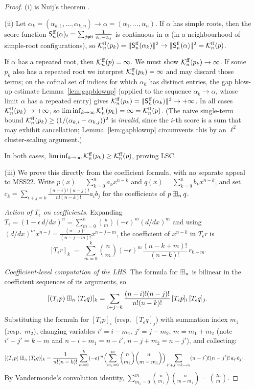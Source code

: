 \begin{proof}
(i) is Nuij's theorem \cite{Nuij}.

(ii) Let $\alpha_k=(\alpha_{k,1},\dots,\alpha_{k,n})\to\alpha=(\alpha_1,\dots,\alpha_n)$.
If $\alpha$ has simple roots, then the score function
$\mathsf{S}^{\mathrm{ff}}_n(\alpha)_i=\sum_{j\ne i}\frac{1}{\alpha_i-\alpha_j}$ is continuous in
$\alpha$ (in a neighbourhood of simple-root configurations), so
$\mathcal{K}^{\mathrm{ff}}_n(p_k)=\|\mathsf{S}^{\mathrm{ff}}_n(\alpha_k)\|^2\to\|\mathsf{S}^{\mathrm{ff}}_n(\alpha)\|^2=\mathcal{K}^{\mathrm{ff}}_n(p)$.

If $\alpha$ has a repeated root, then $\mathcal{K}^{\mathrm{ff}}_n(p)=\infty$. We must show
$\mathcal{K}^{\mathrm{ff}}_n(p_k)\to\infty$. If some $p_k$ also has a repeated root we interpret
$\mathcal{K}^{\mathrm{ff}}_n(p_k)=\infty$ and may discard those terms; on the cofinal set of indices
for which $\alpha_k$ has distinct entries, the gap blow-up estimate
Lemma~\ref{lem:gapblowup} (applied to the sequence $\alpha_k\to\alpha$, whose limit
$\alpha$ has a repeated entry) gives $\mathcal{K}^{\mathrm{ff}}_n(p_k)=\|\mathsf{S}^{\mathrm{ff}}_n(\alpha_k)\|^2\to+\infty$.
In all cases $\mathcal{K}^{\mathrm{ff}}_n(p_k)\to+\infty$, so
$\liminf_{k\to\infty}\mathcal{K}^{\mathrm{ff}}_n(p_k)=\infty=\mathcal{K}^{\mathrm{ff}}_n(p)$.
(The naive single-term bound $\mathcal{K}^{\mathrm{ff}}_n(p_k)\ge(1/(\alpha_{k,i}-\alpha_{k,j}))^2$ is
\emph{invalid}, since the $i$-th score is a sum that may exhibit cancellation;
Lemma~\ref{lem:gapblowup} circumvents this by an $\ell^2$ cluster-scaling argument.)

In both cases, $\liminf_{k\to\infty}\mathcal{K}^{\mathrm{ff}}_n(p_k)\ge\mathcal{K}^{\mathrm{ff}}_n(p)$, proving LSC.

(iii) We prove this directly from the coefficient formula, with no separate
appeal to MSS22.  Write $p(x)=\sum_{k=0}^n a_k x^{n-k}$ and
$q(x)=\sum_{k=0}^n b_k x^{n-k}$, and set
$c_k = \sum_{i+j=k}\frac{(n-i)!(n-j)!}{n!(n-k)!}a_i b_j$ for the
coefficients of $p\boxplus_n q$.

\smallskip\noindent\textit{Action of $T_\epsilon$ on coefficients.}
Expanding $T_\epsilon=(1-\epsilon\,d/dx)^n=\sum_{m=0}^n\binom{n}{m}(-\epsilon)^m(d/dx)^m$
and using $(d/dx)^m x^{n-j}=\tfrac{(n-j)!}{(n-j-m)!}x^{n-j-m}$, the
coefficient of $x^{n-k}$ in $T_\epsilon r$ is
\[
[T_\epsilon r]_k
\;=\;\sum_{m=0}^k \binom{n}{m}(-\epsilon)^m\frac{(n{-}k{+}m)!}{(n{-}k)!}\,r_{k-m}.
\]

\smallskip\noindent\textit{Coefficient-level computation of the LHS.}
The formula for $\boxplus_n$ is bilinear in the coefficient sequences of its
arguments, so
\[
[(T_\epsilon p)\boxplus_n(T_\epsilon q)]_k
= \sum_{i+j=k}\frac{(n-i)!(n-j)!}{n!(n-k)!}\,[T_\epsilon p]_i\,[T_\epsilon q]_j.
\]
Substituting the formula for $[T_\epsilon p]_i$ (resp.\ $[T_\epsilon q]_j$)
with summation index $m_1$ (resp.\ $m_2$), changing variables
$i'=i-m_1$, $j'=j-m_2$, $m=m_1+m_2$ (note $i'+j'=k-m$ and
$n-i+m_1=n-i'$, $n-j+m_2=n-j'$), and collecting:
\begin{align}\label{eq:lhs-vandermonde}
[(T_\epsilon p)\boxplus_n(T_\epsilon q)]_k
&= \frac{1}{n!(n-k)!}\sum_{m=0}^k(-\epsilon)^m
   \Bigl(\sum_{m_1=0}^m\binom{n}{m_1}\binom{n}{m-m_1}\Bigr)
   \sum_{i'+j'=k-m}(n-i')!(n-j')!\,a_{i'}b_{j'}.
\end{align}
By Vandermonde's convolution identity,
$\sum_{m_1=0}^m\binom{n}{m_1}\binom{n}{m-m_1}=\binom{2n}{m}$.


\end{proof}
